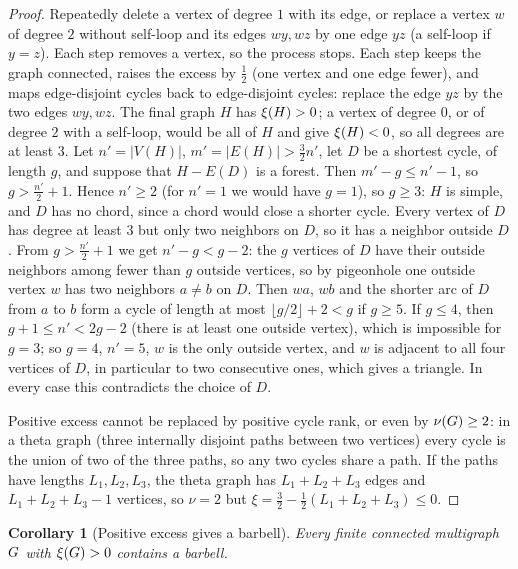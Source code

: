 \documentclass[11pt,a4paper]{article}
\newtheorem{corollary}[theorem]{Corollary}
\theoremstyle{definition}
\theoremstyle{remark}
\theoremstyle{plain}
\theoremstyle{definition}
\begin{document}
\begin{proof}
Repeatedly delete a vertex of degree \(1\) with its edge, or replace a vertex
\(w\) of degree \(2\) without self-loop and its edges \(wy,wz\) by one edge
\(yz\) (a self-loop if \(y=z\)). Each step removes a vertex, so the process
stops. Each step keeps the graph connected, raises the excess by \(\frac12\)
(one vertex and one edge fewer), and maps edge-disjoint cycles back to
edge-disjoint cycles: replace the edge \(yz\) by the two edges \(wy,wz\). The final graph \(H\) has \(\xi(H)>0\); a vertex of degree \(0\),
or of degree \(2\) with a self-loop, would be all of \(H\) and give
\(\xi(H)<0\), so all degrees are at least \(3\). Let \(n'=|V(H)|\),
\(m'=|E(H)|>\frac32n'\), let \(D\) be a shortest cycle, of length \(g\), and
suppose that \(H-E(D)\) is a forest. Then \(m'-g\le n'-1\), so
\(g>\frac{n'}2+1\). Hence \(n'\ge2\) (for \(n'=1\) we would have \(g=1\)), so
\(g\ge3\): \(H\) is simple, and \(D\) has no chord, since a chord would close
a shorter cycle. Every vertex of \(D\) has degree at least \(3\) but only two
neighbors on \(D\), so it has a neighbor outside \(D\). From
\(g>\frac{n'}2+1\) we get \(n'-g<g-2\): the \(g\) vertices of \(D\) have their
outside neighbors among fewer than \(g\) outside vertices, so by pigeonhole one
outside vertex \(w\) has two neighbors \(a\ne b\) on \(D\). Then \(wa\), \(wb\) and the shorter arc of
\(D\) from \(a\) to \(b\) form a cycle of length at most
\(\lfloor g/2\rfloor+2<g\) if \(g\ge5\). If \(g\le4\), then
\(g+1\le n'<2g-2\) (there is at least one outside vertex), which is
impossible for \(g=3\); so \(g=4\), \(n'=5\), \(w\) is the only outside
vertex, and \(w\) is adjacent to all four vertices of \(D\), in particular to
two consecutive ones, which gives a triangle. In every case this contradicts the choice of
\(D\).

Positive excess cannot be replaced by positive cycle rank, or even by
\(\nu(G)\ge2\): in a theta graph (three internally disjoint paths between two
vertices) every cycle is the union of two of the three paths, so any two
cycles share a path. If the paths have lengths \(L_1,L_2,L_3\), the
theta graph has \(L_1+L_2+L_3\) edges and \(L_1+L_2+L_3-1\) vertices, so
\(\nu=2\) but \(\xi=\frac32-\frac12(L_1+L_2+L_3)\le0\).
\end{proof}

\begin{corollary}[Positive excess gives a barbell]\label{cor:excess-barbell}
Every finite connected multigraph \(G\) with \(\xi(G)>0\) contains a barbell.
\end{corollary}
\end{document}
